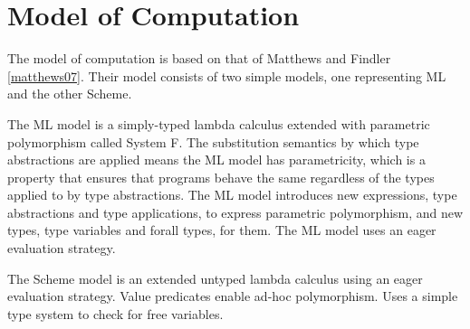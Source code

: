 \newcommand{\haskell}{Haskell model\xspace}
\newcommand{\ml}{ML model\xspace}
\newcommand{\scheme}{Scheme model\xspace}

\newcommand{\haskellml}{Haskell and ML models\xspace}
\newcommand{\haskellmlscheme}{Haskell, ML, and Scheme models\xspace}

\newcommand{\articlehaskell}[1]{#1 \haskell}
\newcommand{\articleml}[1]{#1 \ml}
\newcommand{\articlescheme}[1]{#1 \scheme}

\newcommand{\articlehaskellml}[1]{#1 \haskellml}
\newcommand{\articlehaskellmlscheme}[1]{#1 \haskellmlscheme}

\newcommand{\thehaskell}{\articlehaskell{the}}
\newcommand{\Thehaskell}{\articlehaskell{The}}
\newcommand{\theml}{\articleml{the}}
\newcommand{\Theml}{\articleml{The}}
\newcommand{\thescheme}{\articlescheme{the}}
\newcommand{\Thescheme}{\articlescheme{The}}

\newcommand{\thehaskellml}{\articlehaskellml{the}}
\newcommand{\Thehaskellml}{\articlehaskellml{The}}
\newcommand{\thehaskellmlscheme}{\articlehaskellmlscheme{the}}
\newcommand{\Thehaskellmlscheme}{\articlehaskellmlscheme{The}}

\newcommand{\hastype}[1]{has the type #1}
\newcommand{\havetype}[1]{have the type #1}

\chapter{Model of Computation}

The model of computation is based on that of Matthews and Findler \ref{matthews07}. Their model consists of two simple models, one representing ML and the other Scheme.

The ML model is a simply-typed lambda calculus extended with parametric polymorphism called System F. The substitution semantics by which type abstractions are applied means the ML model has parametricity, which is a property that ensures that programs behave the same regardless of the types applied to by type abstractions.  The ML model introduces new expressions, type abstractions and type applications, to express parametric polymorphism, and new types, type variables and forall types, for them. The ML model uses an eager evaluation strategy.

The Scheme model is an extended untyped lambda calculus using an eager evaluation strategy. Value predicates enable ad-hoc polymorphism. Uses a simple type system to check for free variables.


